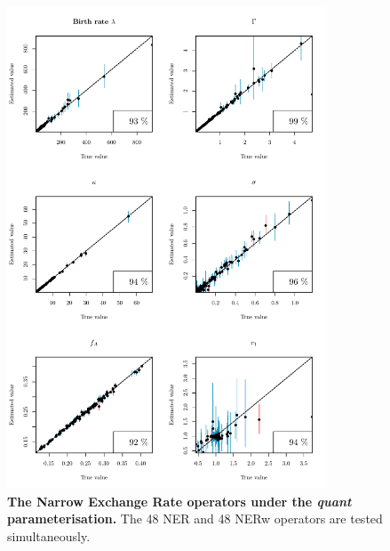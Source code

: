 \documentclass[12pt]{article}
\begin{document}
\begin{figure}[!htb]
\includegraphics[width=0.85\textwidth]{Figures/CalSim_NER_quant.pdf}
\caption{\textbf{The Narrow Exchange Rate operators under the \textit{quant} parameterisation.} The 48 NER and 48 NERw operators are tested simultaneously.}
\label{fig:rateparams}
\end{figure}






\end{document}
